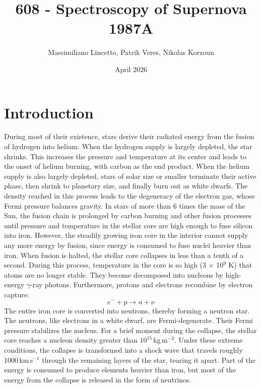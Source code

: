 \documentclass{article}
\title{608 - Spectroscopy of Supernova 1987A}
\author{Massimiliano Lincetto, Patrik Veres, Nikolas Korzoun}
\date{April 2026}
\begin{document}
\maketitle

\section{Introduction}

During most of their existence, stars derive their radiated energy from the fusion of hydrogen into helium.
When the hydrogen supply is largely depleted, the star shrinks. 
This increases the pressure and temperature at its center and leads to the onset of helium burning, with carbon as the end product.
When the helium supply is also largely depleted, stars of solar size or smaller terminate their active phase, then shrink to planetary size, and finally burn out as white dwarfs.
The density reached in this process leads to the degeneracy of the electron gas, whose Fermi pressure balances gravity.
In stars of more than 6 times the mass of the Sun, the fusion chain is prolonged by carbon burning and other fusion processes until pressure and temperature in the stellar core are high enough to fuse silicon into iron.
However, the steadily growing iron core in the interior cannot supply any more energy by fusion, since energy is consumed to fuse nuclei heavier than iron.
When fusion is halted, the stellar core collapses in less than a tenth of a second.
During this process, temperature in the core is so high (3 $\times$ 10$^9$ K) that atoms are no longer stable.
They become decomposed into nucleons by high-energy $\gamma$-ray photons.
Furthermore, protons and electrons recombine by electron capture:
\begin{equation}
    e^{-} + p \to n + \nu
\end{equation}
The entire iron core is converted into neutrons, thereby forming a neutron star.
The neutrons, like electrons in a white dwarf, are Fermi-degenerate.
Their Fermi pressure stabilizes the nucleus.
For a brief moment during the collapse, the stellar core reaches a nucleon density greater than $10^{15}$\,kg\,m$^{-3}$.
Under these extreme conditions, the collapse is transformed into a shock wave that travels roughly 1000\,km\,s$^{-1}$ through the remaining layers of the star, tearing it apart.
Part of the energy is consumed to produce elements heavier than iron, but most of the energy from the collapse is released in the form of neutrinos.
\end{document}
